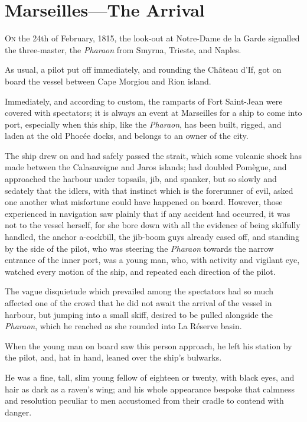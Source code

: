 \chapter{Marseilles—The Arrival} 

 \lettrine{O}{n} the 24th of February, 1815, the look-out at Notre-Dame de la Garde signalled the three-master, the \textit{Pharaon} from Smyrna, Trieste, and Naples. 

\zz
 As usual, a pilot put off immediately, and rounding the Château d'If, got on board the vessel between Cape Morgiou and Rion island. 

 Immediately, and according to custom, the ramparts of Fort Saint-Jean were covered with spectators; it is always an event at Marseilles for a ship to come into port, especially when this ship, like the \textit{Pharaon}, has been built, rigged, and laden at the old Phocée docks, and belongs to an owner of the city. 

 The ship drew on and had safely passed the strait, which some volcanic shock has made between the Calasareigne and Jaros islands; had doubled Pomègue, and approached the harbour under topsails, jib, and spanker, but so slowly and sedately that the idlers, with that instinct which is the forerunner of evil, asked one another what misfortune could have happened on board. However, those experienced in navigation saw plainly that if any accident had occurred, it was not to the vessel herself, for she bore down with all the evidence of being skilfully handled, the anchor a-cockbill, the jib-boom guys already eased off, and standing by the side of the pilot, who was steering the \textit{Pharaon} towards the narrow entrance of the inner port, was a young man, who, with activity and vigilant eye, watched every motion of the ship, and repeated each direction of the pilot. 

 The vague disquietude which prevailed among the spectators had so much affected one of the crowd that he did not await the arrival of the vessel in harbour, but jumping into a small skiff, desired to be pulled alongside the \textit{Pharaon}, which he reached as she rounded into La Réserve basin. 

 When the young man on board saw this person approach, he left his station by the pilot, and, hat in hand, leaned over the ship's bulwarks. 

 He was a fine, tall, slim young fellow of eighteen or twenty, with black eyes, and hair as dark as a raven's wing; and his whole appearance bespoke that calmness and resolution peculiar to men accustomed from their cradle to contend with danger. 

